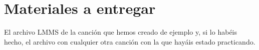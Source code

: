 \documentclass[es,practica]{uah}
\begin{document}
%
%
%
%
%
%
%


\section{Materiales a entregar}

El archivo LMMS de la canción que hemos creado de ejemplo y, si lo habéis hecho, el archivo con cualquier otra canción con la que hayáis estado practicando.
\end{document}
